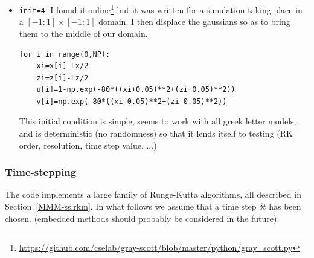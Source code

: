\begin{itemize}
\item \lstinline{init=4}: I found it 
online\footnote{\url{https://github.com/cselab/gray-scott/blob/master/python/gray_scott.py}}
but it was written for a simulation taking place in a $[-1:1]\times[-1:1]$ domain.
I then displace the gaussians so as to bring them to the middle of our domain.

\begin{lstlisting}
for i in range(0,NP):
    xi=x[i]-Lx/2
    zi=z[i]-Lz/2
    u[i]=1-np.exp(-80*((xi+0.05)**2+(zi+0.05)**2))
    v[i]=np.exp(-80*((xi-0.05)**2+(zi-0.05)**2))
\end{lstlisting}

This initial condition is simple, seems to work with all greek letter models, and is 
deterministic (no randomness) so that it lends itself to testing (RK order, resolution, time step value, ...)

\end{itemize}



\subsubsection*{Time-stepping}


The code implements a large family of Runge-Kutta algorithms, all described in 
Section~\ref{MMM-ss:rkm}.
In what follows we assume that a time step $\delta t$ has been chosen. 
(embedded methods should probably be considered in the future).

